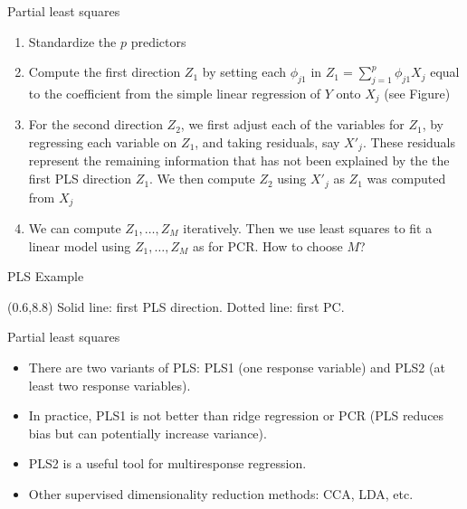 \documentclass[14pt]{beamer}
\begin{document}
\begin{frame}{Partial least squares}\small

\begin{enumerate}
	\item Standardize the $p$ predictors
	\item Compute the first direction $Z_1$ by setting each $\phi_{j1}$ in $Z_1 = \sum_{j = 1}^p \phi_{j1} X_j$ equal to the coefficient from the simple linear regression of $Y$ onto $X_j$ (see Figure)
	\item For the second direction $Z_2$, we first adjust each of the variables for $Z_1$, by regressing each variable on $Z_1$, and taking residuals, say $X'_j$. These residuals represent the remaining information that has not been explained by the the first PLS direction $Z_1$. We then compute $Z_2$ using $X'_j$ as $Z_1$ was computed from $X_j$
	\item We can compute $Z_1, \dots, Z_M$ iteratively. Then we use least squares to fit a linear model using $Z_1, \dots, Z_M$ as for PCR. How to choose $M$?
\end{enumerate}

\end{frame}

\begin{frame}{PLS Example}


\begin{textblock}{12}(0.6,8.8)
\textcolor[RGB]{0,159,134}{Solid line: first PLS direction.}\qquad 
\textcolor[RGB]{0,159,134}{Dotted line: first PC.}
\end{textblock}
\end{frame}


\begin{frame}{Partial least squares}

\begin{itemize}
\item There are two variants of PLS: PLS1 (one response variable) and PLS2 (at least two response variables).
\item In practice, PLS1 is not better than ridge regression or PCR (PLS reduces bias but can potentially increase variance).
\item PLS2 is a useful tool for multiresponse regression.
\item Other supervised dimensionality reduction methods: CCA, LDA, etc.
\end{itemize}

\end{frame}
\end{document}
